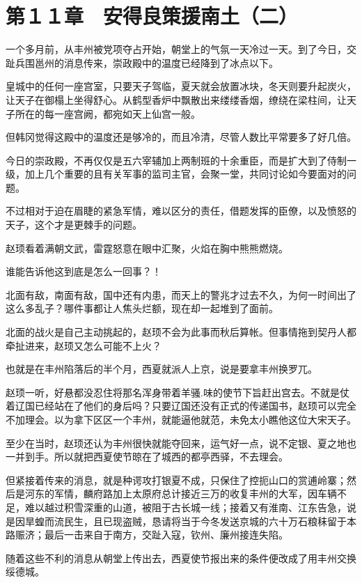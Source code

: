 \section{第１１章　安得良策援南土（二）}

一个多月前，从丰州被党项夺占开始，朝堂上的气氛一天冷过一天。到了今日，交趾兵围邕州的消息传来，崇政殿中的温度已经降到了冰点以下。

皇城中的任何一座宫室，只要天子驾临，夏天就会放置冰块，冬天则要升起炭火，让天子在御榻上坐得舒心。从鹤型香炉中飘散出来缕缕香烟，缭绕在梁柱间，让天子所在的每一座宫阙，都宛如天上仙宫一般。

但韩冈觉得这殿中的温度还是够冷的，而且冷清，尽管人数比平常要多了好几倍。

今日的崇政殿，不再仅仅是五六宰辅加上两制班的十余重臣，而是扩大到了侍制一级，加上几个重要的且有关军事的监司主官，会聚一堂，共同讨论如今要面对的问题。

不过相对于迫在眉睫的紧急军情，难以区分的责任，借题发挥的臣僚，以及愤怒的天子，这个才是更棘手的问题。

赵顼看着满朝文武，雷霆怒意在眼中汇聚，火焰在胸中熊熊燃烧。

谁能告诉他这到底是怎么一回事？！

北面有敌，南面有敌，国中还有内患，而天上的警兆才过去不久，为何一时间出了这么多乱子？哪件事都让人焦头烂额，现在却一起堆到了面前。

北面的战火是自己主动挑起的，赵顼不会为此事而秋后算帐。但事情拖到契丹人都牵扯进来，赵顼又怎么可能不上火？

也就是在丰州陷落后的半个月，西夏就派人上京，说是要拿丰州换罗兀。

赵顼一听，好悬都没忍住将那名浑身带着羊骚.味的使节下旨赶出宫去。不就是仗着辽国已经站在了他们的身后吗？只要辽国还没有正式的传递国书，赵顼可以完全不加理会。以为拿下区区一个丰州，就能逼他就范，未免太小瞧他这位大宋天子。

至少在当时，赵顼还认为丰州很快就能夺回来，运气好一点，说不定银、夏之地也一并到手。所以就把西夏使节晾在了城西的都亭西驿，不去理会。

但紧接着传来的消息，就是种谔攻打银夏不成，只保住了控扼山口的赏逋岭寨；然后是河东的军情，麟府路加上太原府总计接近三万的收复丰州的大军，因车辆不足，难以越过积雪深重的山道，被阻于古长城一线；接着又有淮南、江东告急，说是因旱蝗而流民生，且已现盗贼，恳请将当于今冬发送京城的六十万石粮秣留于本路赈济；最后一击来自于南方，交趾入寇，钦州、廉州接连失陷。

随着这些不利的消息从朝堂上传出去，西夏使节报出来的条件便改成了用丰州交换绥德城。


